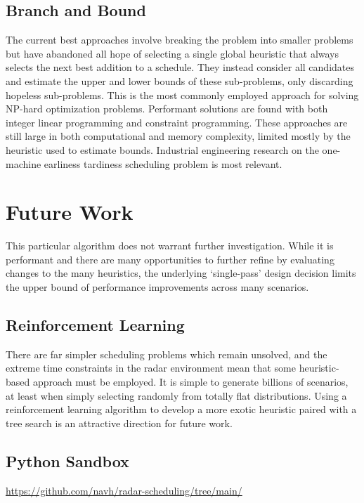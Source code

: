 \documentclass[conference]{IEEEtran}
\begin{document}
\subsection{Branch and Bound}

The current best approaches involve breaking the problem into smaller problems but have abandoned all hope of selecting a single global heuristic that always selects the next best addition to a schedule.
They instead consider all candidates and estimate the upper and lower bounds of these sub-problems, only discarding hopeless sub-problems.
This is the most commonly employed approach for solving NP-hard optimization problems.
Performant solutions are found with both integer linear programming and constraint programming.
These approaches are still large in both computational and memory complexity, limited mostly by the heuristic used to estimate bounds.
Industrial engineering research on the one-machine earliness tardiness scheduling problem is most relevant.

\section{Future Work}

This particular algorithm does not warrant further investigation.
While it is performant and there are many opportunities to further refine by evaluating changes to the many heuristics,
the underlying `single-pass' design decision limits the upper bound of performance improvements across many scenarios.

\subsection{Reinforcement Learning}

There are far simpler scheduling problems which remain unsolved, and the extreme time constraints in the radar environment mean that some heuristic-based approach must be employed.
It is simple to generate billions of scenarios, at least when simply selecting randomly from totally flat distributions.
Using a reinforcement learning algorithm to develop a more exotic heuristic paired with a tree search is an attractive direction for future work.

\subsection{Python Sandbox}

\href{https://github.com/navh/radar-scheduling/tree/main/}{https://github.com/navh/radar-scheduling/tree/main/}
\end{document}

